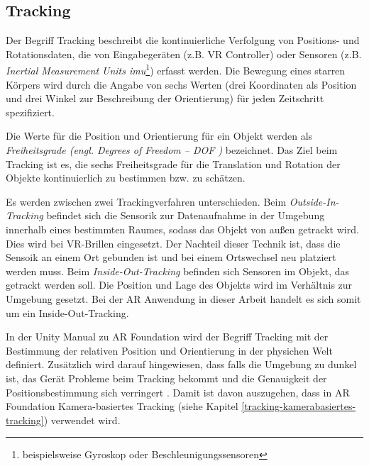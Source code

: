 \subsection{Tracking}
\label{tracking}
Der Begriff Tracking beschreibt die kontinuierliche Verfolgung von Positions- und Rotationsdaten, die von Eingabegeräten (z.B. VR Controller) oder Sensoren (z.B. \textit{Inertial Measurement Units \acrshort{imu}}\footnote{beispielsweise Gyroskop oder Beschleunigungssensoren}) erfasst werden. Die Bewegung eines starren Körpers wird \glqq durch die Angabe von sechs Werten (drei Koordinaten als Position und drei Winkel zur Beschreibung der Orientierung) für jeden Zeitschritt spezifiziert\grqq{}\cite*[Dörner (2019) S.119f.]{doerner}. 

Die Werte für die Position und Orientierung für ein Objekt werden als \textit{Freiheitsgrade (engl. Degrees of Freedom – DOF )} bezeichnet. Das Ziel beim Tracking ist es, die sechs Freiheitsgrade für die Translation und Rotation der Objekte kontinuierlich zu bestimmen bzw. zu schätzen. 

Es werden zwischen zwei Trackingverfahren unterschieden. Beim \textit{Outside-In-Tracking} befindet sich die Sensorik zur Datenaufnahme in der Umgebung innerhalb eines bestimmten Raumes, sodass das Objekt von außen getrackt wird. Dies wird bei VR-Brillen eingesetzt. Der Nachteil dieser Technik ist, dass die Sensoik an einem Ort gebunden ist und bei einem Ortswechsel neu platziert werden muss. Beim \textit{Inside-Out-Tracking} befinden sich Sensoren im Objekt, das getrackt werden soll. Die Position und Lage des Objekts wird im Verhältnis zur Umgebung gesetzt. Bei der AR Anwendung in dieser Arbeit handelt es sich somit um ein Inside-Out-Tracking.

In der Unity Manual zu AR Foundation wird der Begriff Tracking mit der Bestimmung der relativen Position und Orientierung in der physichen Welt definiert. Zusätzlich wird darauf hingewiesen, dass falls die Umgebung zu dunkel ist, das Gerät Probleme beim Tracking bekommt und die Genauigkeit der Positionsbestimmung sich verringert \cite{UnityARFoundation}. Damit ist davon auszugehen, dass in AR Foundation Kamera-basiertes Tracking (siehe Kapitel \ref*{tracking-kamerabasiertes-tracking}) verwendet wird.  

